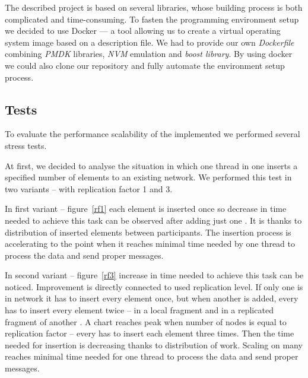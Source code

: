         The described project is based on several libraries, whose building process is both complicated and time-consuming.
        To fasten the programming environment setup we decided to use Docker \cite{Docker} --- a tool allowing us to create a virtual operating system image based on a description file.
        We had to provide our own \textit{Dockerfile} combining \textit{PMDK} libraries, \textit{NVM} emulation and \textit{boost library}.
        By using docker we could also clone our repository and fully automate the environment setup process.
        
    
    \subsection{Tests}
    
        To evaluate the performance scalability of the implemented \DHTS we performed several stress tests.
        
        At first, we decided to analyse the situation in which one thread in one \Node inserts a specified number of elements to an existing network. We performed this test in two variants -- with replication factor 1 and 3.
        
        
        In first variant  -- figure~\ref{rf1} each element is inserted once so decrease in time needed to achieve this task can be observed after adding just one \Node.
        It is thanks to distribution of inserted elements between participants.
        The insertion process is accelerating to the point when it reaches minimal time needed by one thread to process the data and send proper messages.
        
        
        In second variant -- figure~\ref{rf3} increase in time needed to achieve this task can be noticed.
        Improvement is directly connected to used replication level.
        If only one \Node is in network it has to insert every element once, but when another \Node is added, every \Node has to insert every element twice -- in a local \PHT fragment and in a replicated \PHT fragment of another \Node.
        A chart reaches peak when number of nodes is equal to replication factor -- every \Node has to insert each element three times.
        Then the time needed for insertion is decreasing thanks to distribution of work.
        Scaling on many \Nodes reaches minimal time needed for one thread to process the data and send proper messages.
        
